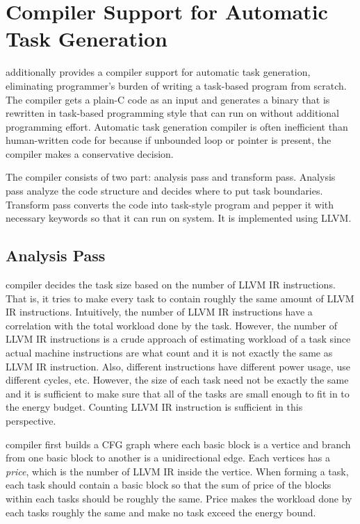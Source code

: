\section{Compiler Support for Automatic Task Generation}
\label{sec:compiler}

\sys additionally provides a compiler support for automatic task
generation, eliminating programmer's burden of writing a task-based
program from scratch. The compiler gets a plain-C code as an input
and generates a binary that is rewritten in task-based programming
style that can run on \sys without additional programming effort. 
Automatic task generation compiler is often inefficient than human-written
code for \sys because if unbounded loop or pointer is present, the
compiler makes a conservative decision. 

The compiler consists of two part: analysis pass and transform pass.
Analysis pass analyze the code structure and decides where to put
task boundaries. Transform pass converts the code into task-style
program and pepper it with necessary \sys keywords so that it can run
on \sys system. It is implemented using LLVM.

\subsection{Analysis Pass}
\label{sec:analysis}

\sys compiler decides the task size based on the number of LLVM IR instructions.
That is, it tries to make every task to contain roughly the same amount of LLVM IR
instructions. Intuitively, the number of LLVM IR instructions have a correlation with
the total workload done by the task. However, the number of LLVM IR instructions is 
a crude approach of estimating workload of a task since actual machine instructions are
what count and it is not exactly the same as LLVM IR instruction. Also, different instructions
have different power usage, use different cycles, etc. However, the size of each
task need not be exactly the same and it is sufficient to make sure that all of the
tasks are small enough to fit in to the energy budget. Counting LLVM IR instruction is sufficient
in this perspective.

\sys compiler first builds a CFG graph where each basic block is a vertice and branch
from one basic block to another is a unidirectional edge. Each vertices has a
{\em price}, which is the number of LLVM IR inside the vertice. 
When forming a task, each task should contain a basic block so that the sum of price of the 
blocks within each tasks should be roughly the same. Price makes the workload done by
each tasks roughly the same and make no task exceed the energy bound.

